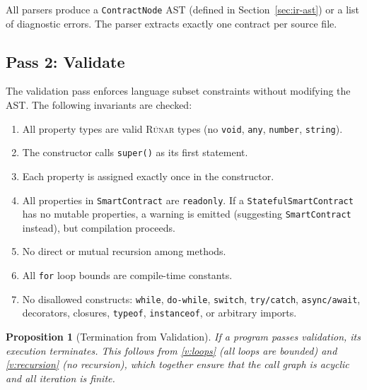 \documentclass[11pt,a4paper]{article}
\newtheorem{proposition}[theorem]{Proposition}
\newcommand{\runar}{\textsc{Rúnar}}
\begin{document}
All parsers produce a \texttt{ContractNode} AST (defined in
Section~\ref{sec:ir-ast}) or a list of diagnostic errors.
The parser extracts exactly one contract per source file.

\subsection{Pass 2: Validate}
\label{sec:pass-validate}

The validation pass enforces language subset constraints without modifying
the AST. The following invariants are checked:

\begin{enumerate}[label=\textbf{V\arabic*}., ref=V\arabic*]
  \item \label{v:types} All property types are valid \runar{} types (no
    \texttt{void}, \texttt{any}, \texttt{number}, \texttt{string}).
  \item \label{v:super} The constructor calls \texttt{super()} as its first
    statement.
  \item \label{v:assign} Each property is assigned exactly once in the
    constructor.
  \item \label{v:readonly} All properties in \texttt{SmartContract} are
    \texttt{readonly}. If a \texttt{StatefulSmartContract} has no mutable
    properties, a warning is emitted (suggesting \texttt{SmartContract}
    instead), but compilation proceeds.
  \item \label{v:recursion} No direct or mutual recursion among methods.
  \item \label{v:loops} All \texttt{for} loop bounds are compile-time
    constants.
  \item \label{v:subset} No disallowed constructs: \texttt{while},
    \texttt{do-while}, \texttt{switch}, \texttt{try/catch},
    \texttt{async/await}, decorators, closures, \texttt{typeof},
    \texttt{instanceof}, or arbitrary imports.
\end{enumerate}

\begin{proposition}[Termination from Validation]
\label{prop:termination}
If a program passes validation, its execution terminates. This follows from
\ref{v:loops} (all loops are bounded) and \ref{v:recursion} (no recursion),
which together ensure that the call graph is acyclic and all iteration is
finite.
\end{proposition}
\end{document}
